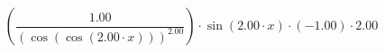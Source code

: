 \documentclass[a4paper]{article}
\begin{document}
\newpage

\[ \left( \dfrac{ 1.00 }{  \left( \cos{ \left(\cos{ \left(2.00 \cdot x\right) }\right) } \right)^{2.00 }  }  \right)  \cdot \sin{ \left(2.00 \cdot x\right) } \cdot (-1.00) \cdot 2.00\] 
\end{document}
